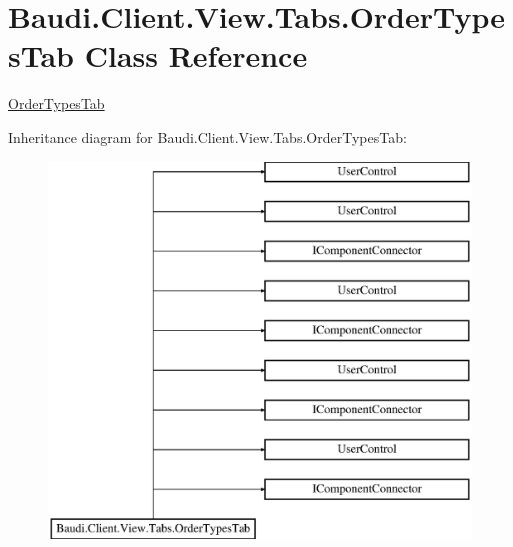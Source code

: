 \hypertarget{class_baudi_1_1_client_1_1_view_1_1_tabs_1_1_order_types_tab}{}\section{Baudi.\+Client.\+View.\+Tabs.\+Order\+Types\+Tab Class Reference}
\label{class_baudi_1_1_client_1_1_view_1_1_tabs_1_1_order_types_tab}


\hyperlink{class_baudi_1_1_client_1_1_view_1_1_tabs_1_1_order_types_tab}{Order\+Types\+Tab}  


Inheritance diagram for Baudi.\+Client.\+View.\+Tabs.\+Order\+Types\+Tab\+:\begin{figure}[H]
\begin{center}
\leavevmode
\includegraphics[height=10.000000cm]{class_baudi_1_1_client_1_1_view_1_1_tabs_1_1_order_types_tab}
\end{center}
\end{figure}
